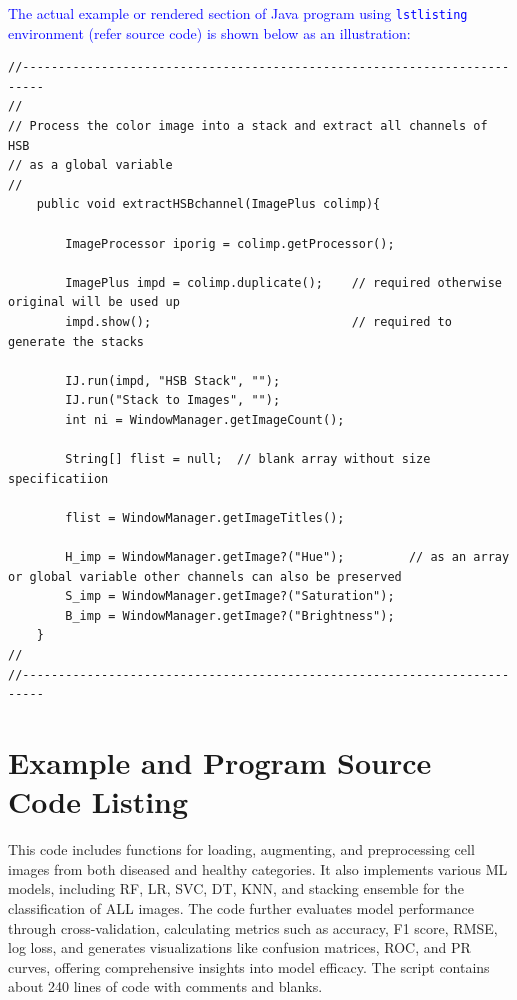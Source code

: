 \documentclass[phd]{ndsu-thesis-2022}
\newcommand\italk[1]{\textcolor{blue}{#1}}  %
\newcommand\vb[1]{\textcolor{blue}{\texttt{#1}}}%
\begin{document}
\italk{The actual example or rendered section of Java program using \vb{lstlisting} environment (refer source code) is shown below as an illustration:}

{\singlespacing
\begin{lstlisting}
//-------------------------------------------------------------------------
//
// Process the color image into a stack and extract all channels of HSB 
// as a global variable
//
	public void extractHSBchannel(ImagePlus colimp){

		ImageProcessor iporig = colimp.getProcessor();
		
		ImagePlus impd = colimp.duplicate();	// required otherwise original will be used up
		impd.show();						    // required to generate the stacks
		
		IJ.run(impd, "HSB Stack", "");
		IJ.run("Stack to Images", "");
		int ni = WindowManager.getImageCount();

		String[] flist = null;  // blank array without size specificatiion

		flist = WindowManager.getImageTitles();
		
		H_imp = WindowManager.getImage?("Hue");			// as an array or global variable other channels can also be preserved
		S_imp = WindowManager.getImage?("Saturation");
		B_imp = WindowManager.getImage?("Brightness");
	}	
//
//-------------------------------------------------------------------------	
\end{lstlisting}
}



\section{Example and Program Source Code Listing}

This code includes functions for loading, augmenting, and preprocessing cell images from both diseased and healthy categories. It also implements various ML models, including RF, LR, SVC, DT, KNN, and stacking ensemble for the classification of ALL images. The code further evaluates model performance through cross-validation, calculating metrics such as accuracy, F1 score, RMSE, log loss, and generates visualizations like confusion matrices, ROC, and PR curves, offering comprehensive insights into model efficacy. The script contains about 240 lines of code with comments and blanks. 

\vspace{4ex}	
\end{document}
